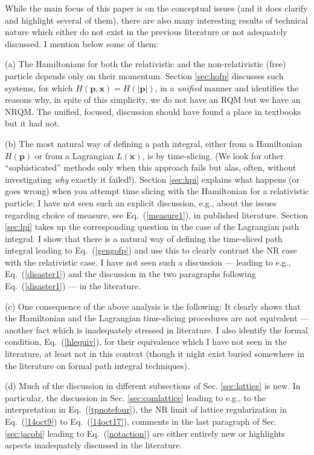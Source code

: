 \documentclass{article}
\def\eq#1{{Eq.~(\ref{#1})}}
\begin{document}
While the main focus of this paper is on the conceptual issues (and it does clarify and highlight several of them), there are also many interesting results of technical nature which either do not exist in the previous literature or not adequately discussed. I mention below some of them:

(a) The Hamiltonians for both the relativistic and the non-relativistic (free) particle depends only on their momentum.  Section \ref{sec:hofp} discusses such systems, for which $H(\bm{p},\bm{x})=H(|\bm{p}|)$, in a \textit{unified} manner and identifies the reasons why, in spite of this simplicity, we do not have an RQM but we have an NRQM. The unified, focused, discussion should have found a place in textbooks but it had not.

(b) The most natural way of defining a path integral, either from a Hamiltonian $H(\bm p)$ or from a Lagrangian $L(\dot{\bm x})$, is by time-slicing. (We look for other ``sophisticated''  methods only when this approach fails but alas, often, without investigating \textit{why} exactly it failed!). Section \ref{sec:hpi} explains what happens (or goes wrong) when you attempt time slicing with the Hamiltonian for a relativistic particle; I have not seen such an explicit discussion, e.g., about the issues regarding choice of measure, see \eq{measure1}, in published literature. Section \ref{sec:lpi} takes up the corresponding question in the case of the Lagrangian path integral. I show that there is a natural way of defining the time-sliced path integral leading to \eq{gengofp} and use this to clearly contrast the NR case with the relativistic case. I have not seen such a discussion --- leading to e.g., \eq{disaster1} and the discussion in the  two paragraphs following \eq{disaster1} --- in the literature.

(c) One consequence of the above analysis is the following: It clearly shows that the Hamiltonian and the Lagrangian time-slicing procedures are not equivalent --- another fact which is inadequately stressed in literature. I also identify the formal condition, \eq{hlequiv}, for their equivalence which I have not seen in the literature, at least not in this context (though it night exist buried somewhere in the literature on formal path integral techniques).

(d) Much of the discussion in different subsections of Sec. \ref{sec:lattice} is new. In particular, the discussion in Sec. \ref{sec:comlattice} leading to e.g.,  to the interpretation in \eq{tpnotefour}, the NR limit of lattice regularization in \eq{14oct9} to \eq{14oct17}, comments in the last paragraph of Sec. \ref{sec:jacobi} leading to \eq{notaction} are either entirely new or highlights aspects inadequately discussed in the literature.
\end{document}
